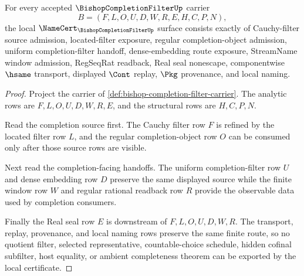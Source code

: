 \begin{theorem}
\label{thm:bishop-completion-filter-namecert-obligations}
For every accepted $\BishopCompletionFilterUp$ carrier
$$
B=(F,L,O,U,D,W,R,E,H,C,P,N),
$$
the local $\NameCert_{\BishopCompletionFilterUp}$ surface consists exactly of Cauchy-filter source admission, located-filter exposure, regular completion-object admission, uniform completion-filter handoff, dense-embedding route exposure, StreamName window admission, RegSeqRat readback, Real seal nonescape, componentwise $\hsame$ transport, displayed $\Cont$ replay, $\Pkg$ provenance, and local naming.
\end{theorem}
\begin{proof}
Project the carrier of \autoref{def:bishop-completion-filter-carrier}. The analytic rows are $F,L,O,U,D,W,R,E$, and the structural rows are $H,C,P,N$.

Read the completion source first. The Cauchy filter row $F$ is refined by the located filter row $L$, and the regular completion-object row $O$ can be consumed only after those source rows are visible.

Next read the completion-facing handoffs. The uniform completion-filter row $U$ and dense embedding row $D$ preserve the same displayed source while the finite window row $W$ and regular rational readback row $R$ provide the observable data used by completion consumers.

Finally the Real seal row $E$ is downstream of $F,L,O,U,D,W,R$. The transport, replay, provenance, and local naming rows preserve the same finite route, so no quotient filter, selected representative, countable-choice schedule, hidden cofinal subfilter, host equality, or ambient completeness theorem can be exported by the local certificate.
\end{proof}

